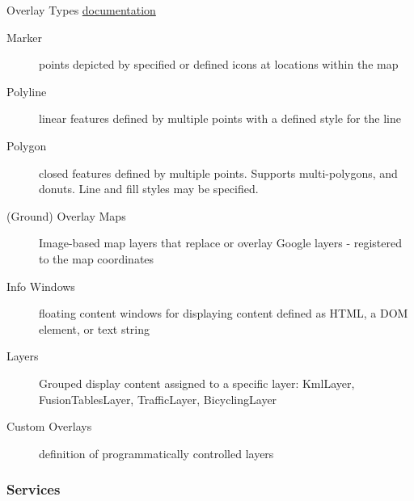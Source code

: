 \documentclass[]{article}
\begin{document}
Overlay Types
\href{http://code.google.com/apis/maps/documentation/javascript/overlays.html}{documentation}

\begin{description}
\item[Marker]
points depicted by specified or defined icons at locations within the
map
\item[Polyline]
linear features defined by multiple points with a defined style for the
line
\item[Polygon]
closed features defined by multiple points. Supports multi-polygons, and
donuts. Line and fill styles may be specified.
\item[(Ground) Overlay Maps]
Image-based map layers that replace or overlay Google layers -
registered to the map coordinates
\item[Info Windows]
floating content windows for displaying content defined as HTML, a DOM
element, or text string
\item[Layers]
Grouped display content assigned to a specific layer: KmlLayer,
FusionTablesLayer, TrafficLayer, BicyclingLayer
\item[Custom Overlays]
definition of programmatically controlled layers
\end{description}

\subsubsection{Services}\label{services}
\end{document}
